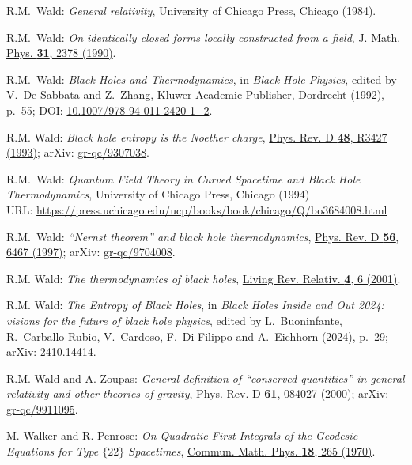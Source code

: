 \begin{thebibliography}{123}
R.M.~Wald:
{\em General relativity},
University of Chicago Press, Chicago (1984).

R.M.~Wald:
{\em On identically closed forms locally constructed from a field},
\href{https://doi.org/10.1063/1.528839}{J. Math. Phys. {\bf 31}, 2378 (1990)}.

R.M.~Wald:
{\em Black Holes and Thermodynamics},
in {\em Black Hole Physics}, edited by V.~De Sabbata and Z.~Zhang,
Kluwer Academic Publisher, Dordrecht (1992), p.~55;
DOI: \href{https://doi.org/10.1007/978-94-011-2420-1_2}{10.1007/978-94-011-2420-1\_2}.

R.M. Wald:
{\em Black hole entropy is the Noether charge},
\href{https://doi.org/10.1103/PhysRevD.48.R3427}{Phys. Rev. D {\bf 48}, R3427 (1993)};
arXiv: \href{https://arxiv.org/abs/gr-qc/9307038}{gr-qc/9307038}.

R.M.~Wald:
{\em Quantum Field Theory in Curved Spacetime and Black Hole Thermodynamics},
University of Chicago Press, Chicago (1994)\\
URL: \url{https://press.uchicago.edu/ucp/books/book/chicago/Q/bo3684008.html}

R.M.~Wald:
{\em ``Nernst theorem'' and black hole thermodynamics},
\href{https://doi.org/10.1103/PhysRevD.56.6467}{Phys. Rev. D {\bf 56}, 6467 (1997)};
arXiv: \href{https://arxiv.org/abs/gr-qc/9704008}{gr-qc/9704008}.

R.M. Wald: {\em The thermodynamics of black holes},
\href{https://doi.org/10.12942/lrr-2001-6}{Living Rev. Relativ. {\bf 4}, 6 (2001)}.

R.M. Wald: {\em The Entropy of Black Holes},
in {\em Black Holes Inside and Out 2024: visions for the future of black hole physics},
edited by L.~Buoninfante, R.~Carballo-Rubio, V.~Cardoso, F.~Di Filippo and A.~Eichhorn
(2024), p.~29;
arXiv: \href{https://arxiv.org/abs/2410.14414}{2410.14414}.

R.M. Wald and A. Zoupas:
{\em General definition of ``conserved quantities'' in general relativity and other theories of gravity},
\href{https://doi.org/10.1103/PhysRevD.61.084027}{Phys. Rev. D {\bf 61}, 084027 (2000)};
arXiv: \href{https://arxiv.org/abs/gr-qc/9911095}{gr-qc/9911095}.

M. Walker and R. Penrose: {\em On Quadratic First Integrals of the Geodesic Equations
for Type $\{22\}$ Spacetimes},
\href{https://doi.org/10.1007/BF01649445}{Commun. Math. Phys. {\bf 18}, 265 (1970)}.


\end{thebibliography}
